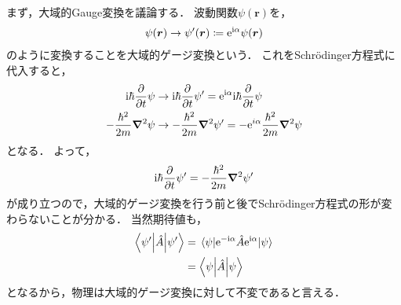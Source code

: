 \documentclass{report}
\begin{document}
  まず，大域的Gauge変換を議論する．
  波動関数$\psi(\bm{r})$を，
  \begin{align}
    \psi(\bm{r}) \to \psi'(\bm{r}) \coloneqq \mathrm{e}^{\mathrm{i}\alpha}\psi(\bm{r})
  \end{align}
  のように変換することを大域的ゲージ変換という．
  これをSchrödinger方程式に代入すると，
  \begin{align}
    \mathrm{i}\hbar\pdv{t}\psi &\to \mathrm{i}\hbar\pdv{t}\psi' = \mathrm{e}^{\mathrm{i}\alpha}\mathrm{i}\hbar\pdv{t}\psi \\ 
    -\frac{\hbar^2}{2m}\grad^2\psi &\to -\frac{\hbar^2}{2m}\grad^2\psi' = -\mathrm{e}^{i\alpha}\frac{\hbar^2}{2m}\grad^2\psi
  \end{align}
  となる．
  よって，
  \begin{align}
    \mathrm{i}\hbar\pdv{t}\psi' = -\frac{\hbar^2}{2m}\grad^2\psi'
  \end{align}
  が成り立つので，大域的ゲージ変換を行う前と後でSchr\"odinger方程式の形が変わらないことが分かる．
  当然期待値も，
  \begin{align}
    \mel**{\psi'}{\hat{A}}{\psi'} &= \mel{\psi}{\mathrm{e}^{-\mathrm{i}\alpha}\hat{A}\mathrm{e}^{\mathrm{i}\alpha}}{\psi} \\ 
    &= \mel**{\psi}{\hat{A}}{\psi}
  \end{align}
  となるから，物理は大域的ゲージ変換に対して不変であると言える．
\end{document}
